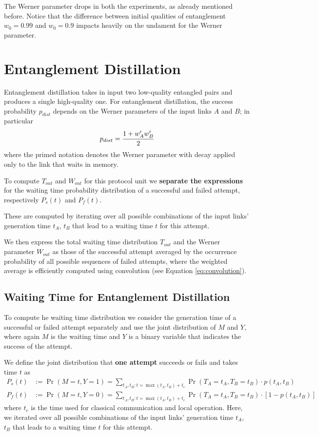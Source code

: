 \documentclass{masterthesis}
\begin{document}
The Werner parameter drops in both the experiments, as already mentioned before.
Notice that the difference between initial qualities of entanglement $w_0 = 0.99$ and $w_0 = 0.9$ impacts heavily on the undament for the Werner parameter.

\newpage
\section*{Entanglement Distillation}

Entanglement distillation takes in input two low-quality entangled pairs and produces a single high-quality one.
For entanglement distillation, the success probability $p_{dist}$ depends on the Werner parameters of the input links $A$ and $B$; in particular
\begin{equation}
    p_{dist} = \cfrac{1+w_A'w_B'}{2}
\end{equation}
where the primed notation denotes the Werner parameter with decay applied only to the link that waits in memory.

To compute $T_{out}$ and $W_{out}$ for this protocol unit we \textbf{separate the expressions} for the waiting time probability distribution of a successful and failed attempt, respectively $P_s(t)$ and $P_f(t)$.

These are computed by iterating over all possible combinations of the input links' generation time $t_A$, $t_B$ that lead to a waiting time $t$ for this attempt.

We then express the total waiting time distribution $T_{out}$ and the Werner parameter $W_{out}$ as those of the successful attempt averaged by the occurrence probability of all possible sequences of failed attempts, where the weighted average is efficiently computed using convolution (see Equation \ref{eq:convolution}). %

\subsection*{Waiting Time for Entanglement Distillation}

To compute he waiting time distribution we consider the generation time of a successful or failed attempt separately and use the joint distribution of $M$ and $Y$, where again $M$ is the waiting time and $Y$ is a binary variable that indicates the success of the attempt. %

We define the joint distribution that \textbf{one attempt} succeeds or fails and takes time $t$ as %
\begin{align}
    P_s(t) &:= \Pr(M = t, Y = 1) = \sum_{t_A, t_B : t = \max(t_A, t_B) + t_c} \Pr(T_A = t_A, T_B = t_B) \cdot p(t_A, t_B) \\
    P_f(t) &:= \Pr(M = t, Y = 0) = \sum_{t_A, t_B : t = \max(t_A, t_B) + t_c} \Pr(T_A = t_A, T_B = t_B) \cdot [1 - p(t_A, t_B)]
\end{align}
where $t_c$ is the time used for classical communication and local operation. Here, we iterated over all possible combinations of the input links' generation time $t_A$, $t_B$ that leads to a waiting time $t$ for this attempt.
\end{document}
